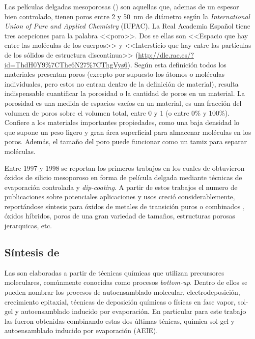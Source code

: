 	Las películas delgadas mesoporosas (\pdm) son aquellas que, ademas de un espesor bien controlado, tienen poros entre 2 y \SI{50}{\nm} de diámetro según la  \textit{International Union of Pure and Applied Chemistry} (IUPAC)\cite{iupac-1994}. La Real Academia Español tiene tres acepciones para la palabra <<poro>>. Dos se ellas son <<Espacio que hay entre las moléculas de los cuerpos>> y <<Intersticio que hay entre las partículas de los sólidos de estructura discontinua>> (\url{http://dle.rae.es/?id=ThdH0Y9%7CThe6N27%7CThgVys6}). Según esta definición todos los materiales presentan poros (excepto por supuesto los átomos o moléculas individuales, pero estos no entran dentro de la definición de material), resulta indispensable cuantificar la porosidad o la cantidad de poros en un material. La porosidad es una medida de espacios vacíos en un material, es una fracción del volumen de poros sobre el volumen total, entre 0 y 1 (o entre 0\% y 100\%).\cite{iupac-1994} Confiere a los materiales importantes propiedades, como una baja densidad lo que supone un peso ligero y gran área superficial para almacenar moléculas en los poros. Además, el tamaño del poro puede funcionar como un tamiz para separar moléculas.\cite{Martin2004} 


	Entre 1997 y 1998 se reportan los primeros trabajos en los cuales de obtuvieron óxidos de silicio mesoporoso en forma de película delgada mediante técnicas de evaporación controlada y \textit{dip-coating}.\cite{Lu1997,Zhao1998a,Zhao1998,Brinker1999} A partir de estos trabajos el numero de publicaciones sobre potenciales aplicaciones y usos creció considerablemente, reportándose síntesis para óxidos de metales de transición puros o combinados \cite{Ciesla1996,Ulagappan1996,Antonelli1995}, óxidos híbridos, poros de una gran variedad de tamaños, estructuras porosas jerarquicas, etc.\cite{Soler-Illia2006,Moller1998} %

	\subsection{Síntesis de \pdm}

	Las \pdm\space son elaboradas a partir de técnicas químicas que utilizan precursores moleculares, comúnmente conocidas como procesos \textit{bottom-up}. Dentro de ellos se pueden nombrar los procesos de autoensamblado molecular, electrodeposición, crecimiento epitaxial, técnicas de deposición químicas o físicas en fase vapor, sol-gel y autoensamblado inducido por evaporación. En particular para este trabajo las \pdm\space fueron obtenidas combinando estas dos últimas ténicas, química sol-gel y autoensamblado inducido por evaporación (AEIE).

